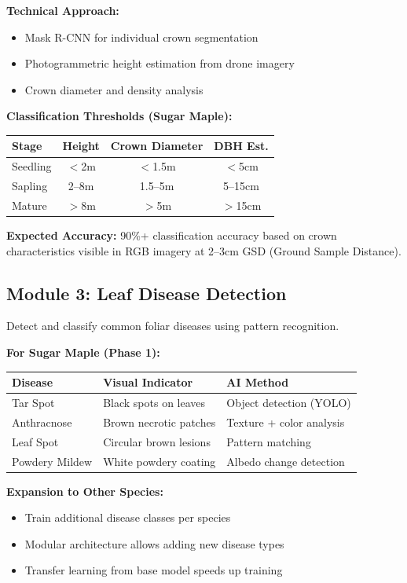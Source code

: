 \documentclass[11pt,a4paper]{article}
\begin{document}
\textbf{Technical Approach:}
\begin{itemize}[leftmargin=*]
\item Mask R-CNN for individual crown segmentation
\item Photogrammetric height estimation from drone imagery
\item Crown diameter and density analysis
\end{itemize}

\textbf{Classification Thresholds (Sugar Maple):}
\begin{center}
\begin{tabular}{lccc}
\toprule
\textbf{Stage} & \textbf{Height} & \textbf{Crown Diameter} & \textbf{DBH Est.} \\
\midrule
Seedling & $<$2m & $<$1.5m & $<$5cm \\
Sapling & 2--8m & 1.5--5m & 5--15cm \\
Mature & $>$8m & $>$5m & $>$15cm \\
\bottomrule
\end{tabular}
\end{center}

\textbf{Expected Accuracy:} 90\%+ classification accuracy based on crown characteristics visible in RGB imagery at 2--3cm GSD (Ground Sample Distance).

\subsection{Module 3: Leaf Disease Detection}

Detect and classify common foliar diseases using pattern recognition.

\textbf{For Sugar Maple (Phase 1):}
\begin{center}
\begin{tabular}{lll}
\toprule
\textbf{Disease} & \textbf{Visual Indicator} & \textbf{AI Method} \\
\midrule
Tar Spot & Black spots on leaves & Object detection (YOLO) \\
Anthracnose & Brown necrotic patches & Texture + color analysis \\
Leaf Spot & Circular brown lesions & Pattern matching \\
Powdery Mildew & White powdery coating & Albedo change detection \\
\bottomrule
\end{tabular}
\end{center}

\textbf{Expansion to Other Species:}
\begin{itemize}[leftmargin=*]
\item Train additional disease classes per species
\item Modular architecture allows adding new disease types
\item Transfer learning from base model speeds up training
\end{itemize}
\end{document}
